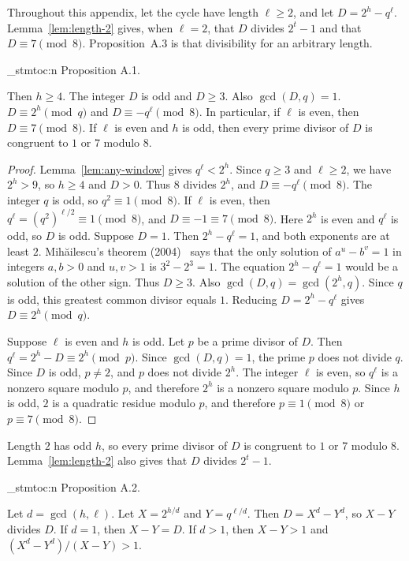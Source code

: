 \documentclass[11pt]{article}
\newenvironment{named}[1]{%
  \par\addvspace{\medskipamount}%
  \pagebreak[3]%
  \noindent{\bfseries #1}\space\ignorespaces
  \stmtoc{#1}%
}{\par\addvspace{\medskipamount}}
\newcommand{\stmtoc}[1]{ \qn_stmtoc:n {#1} }
\begin{document}
Throughout this appendix, let the cycle have length $\ell \ge 2$, and let $D = 2^h - q^\ell$.
Lemma~\ref{lem:length-2} gives, when $\ell = 2$, that $D$ divides $2^t - 1$ and that $D \equiv 7 \pmod{8}$.
Proposition~A.3 is that divisibility for an arbitrary length.

\begin{named}{Proposition A.1.}
Then $h \ge 4$.
The integer $D$ is odd and $D \ge 3$.
Also $\gcd(D, q) = 1$.
$D \equiv 2^h \pmod{q}$ and $D \equiv -q^\ell \pmod{8}$.
In particular, if $\ell$ is even, then $D \equiv 7 \pmod{8}$.
If $\ell$ is even and $h$ is odd, then every prime divisor of $D$ is congruent to $1$ or $7$ modulo $8$.
\end{named}

\begin{proof}
Lemma~\ref{lem:any-window} gives $q^\ell < 2^h$.
Since $q \ge 3$ and $\ell \ge 2$, we have $2^h > 9$, so $h \ge 4$ and $D > 0$.
Thus $8$ divides $2^h$, and $D \equiv -q^\ell \pmod{8}$.
The integer $q$ is odd, so $q^2 \equiv 1 \pmod{8}$.
If $\ell$ is even, then $q^\ell = (q^2)^{\ell/2} \equiv 1 \pmod{8}$, and $D \equiv -1 \equiv 7 \pmod{8}$.
Here $2^h$ is even and $q^\ell$ is odd, so $D$ is odd.
Suppose $D = 1$.
Then $2^h - q^\ell = 1$, and both exponents are at least $2$.
Mihăilescu's theorem (2004)~\cite{mihailescu} says that the only solution of $a^u - b^v = 1$ in integers $a, b > 0$ and $u, v > 1$ is $3^2 - 2^3 = 1$.
The equation $2^h - q^\ell = 1$ would be a solution of the other sign.
Thus $D \ge 3$.
Also $\gcd(D, q) = \gcd(2^h, q)$.
Since $q$ is odd, this greatest common divisor equals $1$.
Reducing $D = 2^h - q^\ell$ gives $D \equiv 2^h \pmod{q}$.

Suppose $\ell$ is even and $h$ is odd.
Let $p$ be a prime divisor of $D$.
Then $q^\ell = 2^h - D \equiv 2^h \pmod{p}$.
Since $\gcd(D, q) = 1$, the prime $p$ does not divide $q$.
Since $D$ is odd, $p \ne 2$, and $p$ does not divide $2^h$.
The integer $\ell$ is even, so $q^\ell$ is a nonzero square modulo $p$, and therefore $2^h$ is a nonzero square modulo $p$.
Since $h$ is odd, $2$ is a quadratic residue modulo $p$, and therefore $p \equiv 1 \pmod{8}$ or $p \equiv 7 \pmod{8}$.
\end{proof}

Length $2$ has odd $h$, so every prime divisor of $D$ is congruent to $1$ or $7$ modulo $8$.
Lemma~\ref{lem:length-2} also gives that $D$ divides $2^t - 1$.

\begin{named}{Proposition A.2.}
Let $d = \gcd(h, \ell)$.
Let $X = 2^{h/d}$ and $Y = q^{\ell/d}$.
Then $D = X^d - Y^d$, so $X - Y$ divides $D$.
If $d = 1$, then $X - Y = D$.
If $d > 1$, then $X - Y > 1$ and $(X^d - Y^d)/(X - Y) > 1$.
\end{named}
\end{document}
